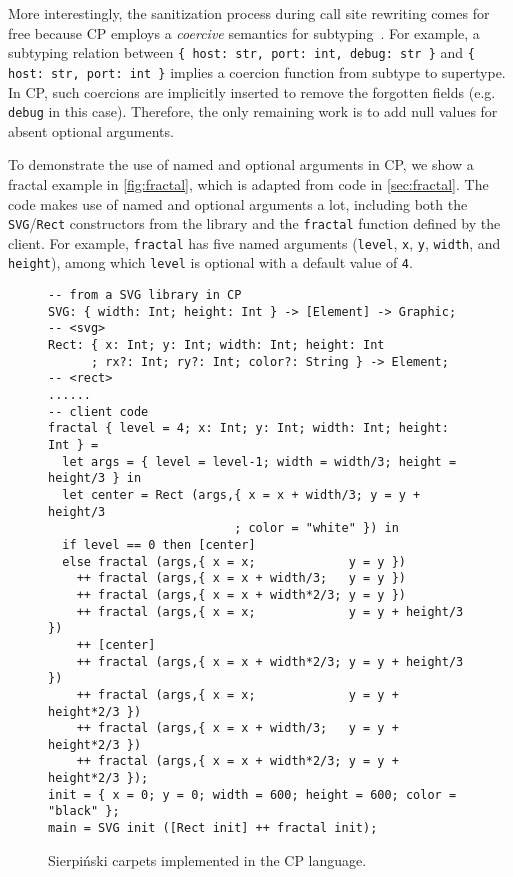 More interestingly, the sanitization process during call site rewriting comes
for free because CP employs a \emph{coercive} semantics for
subtyping~\citep{luo2013coercive}. For example, a subtyping relation between
\lstinline[language={[3]Python}]|{ host: str, port: int, debug: str }| and
\lstinline[language={[3]Python}]|{ host: str, port: int }| implies a coercion
function from subtype to supertype. In CP, such coercions are implicitly
inserted to remove the forgotten fields (e.g. \lstinline{debug} in this case).
Therefore, the only remaining work is to add null values for absent optional
arguments.

To demonstrate the use of named and optional arguments in CP, we show a fractal
example in \autoref{fig:fractal}, which is adapted from code in
\autoref{sec:fractal}. The code makes use of named and optional arguments a lot,
including both the \lstinline{SVG}/\lstinline{Rect} constructors from the
library and the \lstinline{fractal} function defined by the client. For example,
\lstinline{fractal} has five named arguments (\lstinline{level}, \lstinline{x},
\lstinline{y}, \lstinline{width}, and \lstinline{height}), among which
\lstinline{level} is optional with a default value of \lstinline{4}.

\begin{figure}[t]
\begin{lstlisting}[language=CP,xleftmargin=.05\textwidth]
-- from a SVG library in CP
SVG: { width: Int; height: Int } -> [Element] -> Graphic;    -- <svg>
Rect: { x: Int; y: Int; width: Int; height: Int
      ; rx?: Int; ry?: Int; color?: String } -> Element;     -- <rect>
......
-- client code
fractal { level = 4; x: Int; y: Int; width: Int; height: Int } =
  let args = { level = level-1; width = width/3; height = height/3 } in
  let center = Rect (args,{ x = x + width/3; y = y + height/3
                          ; color = "white" }) in
  if level == 0 then [center]
  else fractal (args,{ x = x;             y = y })
    ++ fractal (args,{ x = x + width/3;   y = y })
    ++ fractal (args,{ x = x + width*2/3; y = y })
    ++ fractal (args,{ x = x;             y = y + height/3 })
    ++ [center]
    ++ fractal (args,{ x = x + width*2/3; y = y + height/3 })
    ++ fractal (args,{ x = x;             y = y + height*2/3 })
    ++ fractal (args,{ x = x + width/3;   y = y + height*2/3 })
    ++ fractal (args,{ x = x + width*2/3; y = y + height*2/3 });
init = { x = 0; y = 0; width = 600; height = 600; color = "black" };
main = SVG init ([Rect init] ++ fractal init);
\end{lstlisting}
\caption{Sierpiński carpets implemented in the CP language.} \label{fig:fractal}
\end{figure}

